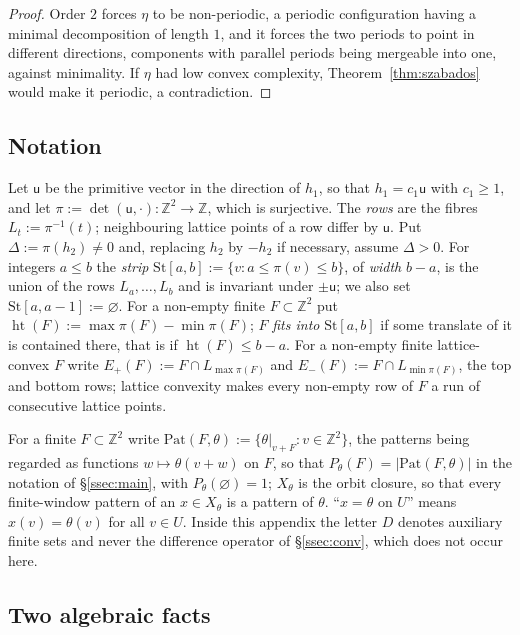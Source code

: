 \documentclass[11pt,reqno]{amsart}
\theoremstyle{plain}
\theoremstyle{definition}
\theoremstyle{remark}
\theoremstyle{plain}
\theoremstyle{remark}
\theoremstyle{definition}
\numberwithin{equation}{section}
\newcommand{\Z}{\mathbb{Z}}
\newcommand{\su}{\mathsf{u}}
\begin{document}
\begin{proof}
Order $2$ forces $\eta$ to be non-periodic, a periodic configuration having a
minimal decomposition of length $1$, and it forces the two periods to point in
different directions, components with parallel periods being mergeable into one,
against minimality.  If $\eta$ had low convex complexity,
Theorem~\ref{thm:szabados} would make it periodic, a contradiction.
\end{proof}

\subsection{Notation}\label{app:szab-notation}

Let $\su$ be the primitive vector in the direction of $h_1$, so that
$h_1=c_1\su$ with $c_1\ge1$, and let $\pi:=\det(\su,\cdot)\colon\Z^2\to\Z$,
which is surjective.  The \emph{rows} are the fibres $L_t:=\pi^{-1}(t)$;
neighbouring lattice points of a row differ by $\su$.  Put $\Delta:=\pi(h_2)\ne0$
and, replacing $h_2$ by $-h_2$ if necessary, assume $\Delta>0$.  For integers
$a\le b$ the \emph{strip} $\mathrm{St}[a,b]:=\{v:a\le\pi(v)\le b\}$, of
\emph{width} $b-a$, is the union of the rows $L_a,\dots,L_b$ and is invariant
under $\pm\su$; we also set $\mathrm{St}[a,a-1]:=\varnothing$.
For a non-empty finite $F\subset\Z^2$ put
$\operatorname{ht}(F):=\max\pi(F)-\min\pi(F)$; $F$ \emph{fits into}
$\mathrm{St}[a,b]$ if some translate of it is contained there, that is if
$\operatorname{ht}(F)\le b-a$.  For a non-empty finite lattice-convex $F$ write
$E_+(F):=F\cap L_{\max\pi(F)}$ and $E_-(F):=F\cap L_{\min\pi(F)}$, the top and
bottom rows; lattice convexity makes every non-empty row of $F$ a run of
consecutive lattice points.

For a finite $F\subset\Z^2$ write
$\mathrm{Pat}(F,\theta):=\{\theta|_{v+F}:v\in\Z^2\}$, the patterns being
regarded as functions $w\mapsto\theta(v+w)$ on $F$, so that
$P_\theta(F)=|\mathrm{Pat}(F,\theta)|$ in the notation of \S\ref{ssec:main},
with $P_\theta(\varnothing)=1$; $X_\theta$
is the orbit closure, so that every finite-window pattern of an $x\in X_\theta$
is a pattern of $\theta$.  ``$x=\theta$ on $U$'' means $x(v)=\theta(v)$ for all
$v\in U$.  Inside this appendix the letter $D$ denotes auxiliary finite sets and
never the difference operator of \S\ref{ssec:conv}, which does not occur here.

\subsection{Two algebraic facts}\label{app:szab-algebra}
\end{document}
